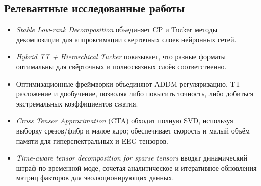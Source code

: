 \subsection*{Релевантные исследованные работы}

\begin{itemize}\setlength\itemsep{0.25em}
    \item \emph{Stable Low-rank Decomposition}  объединяет CP и Tucker методы декомпозиции для аппроксимации сверточных слоев нейронных сетей.
    \item
    \emph{Hybrid TT + Hierarchical Tucker} показывает, что разные форматы оптимальны для свёрточных и полносвязных слоёв соответственно.
    \item Оптимизационные фреймворки объединяют ADDM-регуляризацию, TT-разложение и дообучение, позволяя либо повысить точность, либо добиться экстремальных коэффициентов сжатия.
    \item \emph{Cross Tensor Approximation} (CTA) обходит полную SVD, используя выборку срезов/фибр и малое ядро; обеспечивает скорость и малый объём памяти для гиперспектральных и EEG-тензоров.
    \item \emph{Time-aware tensor decomposition for sparse tensors} вводят динамический штраф по временной моде, сочетая аналитическое и итеративное обновления матриц факторов для эволюционирующих данных.
\end{itemize}